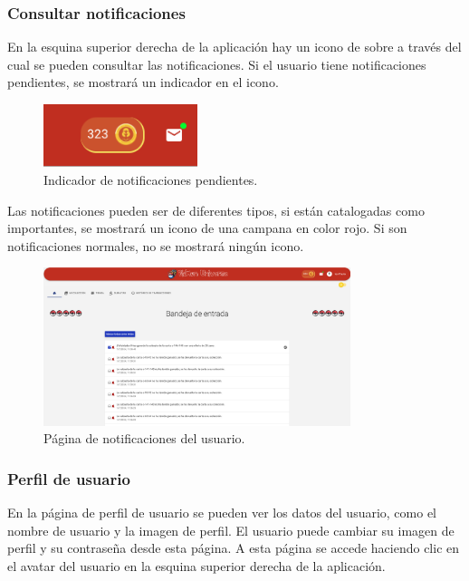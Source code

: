 \subsubsection{Consultar notificaciones}
En la esquina superior derecha de la aplicación hay un icono de sobre a través del cual se pueden consultar las notificaciones.
Si el usuario tiene notificaciones pendientes, se mostrará un indicador en el icono.
\begin{figure}[H]
    \centering
    \includegraphics[width=0.4\textwidth]{figures/6-Analisis/6-Interfaz/interfaz/notificaciones_1.png}
    \caption{Indicador de notificaciones pendientes.}
    \label{fig:m-interfaz-notificaciones1}
\end{figure}
Las notificaciones pueden ser de diferentes tipos, si están catalogadas como importantes, se mostrará un icono de una campana en color rojo.
Si son notificaciones normales, no se mostrará ningún icono.

\begin{figure}[H]
    \centering
    \includegraphics[width=0.8\textwidth]{figures/6-Analisis/6-Interfaz/interfaz/notificaciones_2.png}
    \caption{Página de notificaciones del usuario.}
    \label{fig:m-interfaz-notificaciones2}
\end{figure}


\subsubsection{Perfil de usuario}
En la página de perfil de usuario se pueden ver los datos del usuario, como el nombre de usuario y la imagen de perfil.
El usuario puede cambiar su imagen de perfil y su contraseña desde esta página.
A esta página se accede haciendo clic en el avatar del usuario en la esquina superior derecha de la aplicación.


